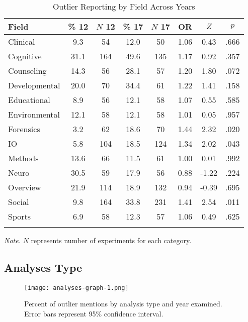 \documentclass[english,,man,mask]{apa6}
\theoremstyle{definition}
\theoremstyle{definition}
\theoremstyle{definition}
\theoremstyle{remark}
\begin{document}
\begin{table}[tbp]
\begin{center}
\begin{threeparttable}
\caption{\label{tab:info-table}Outlier Reporting by Field Across Years}
\begin{tabular}{lccccccc}
\toprule
Field & \% 12 & $N$ 12 & \% 17 & $N$ 17 & OR & $Z$ & $p$\\
\midrule
Clinical & 9.3 & 54 & 12.0 & 50 & 1.06 & 0.43 & .666\\
Cognitive & 31.1 & 164 & 49.6 & 135 & 1.17 & 0.92 & .357\\
Counseling & 14.3 & 56 & 28.1 & 57 & 1.20 & 1.80 & .072\\
Developmental & 20.0 & 70 & 34.4 & 61 & 1.22 & 1.41 & .158\\
Educational & 8.9 & 56 & 12.1 & 58 & 1.07 & 0.55 & .585\\
Environmental & 12.1 & 58 & 12.1 & 58 & 1.01 & 0.05 & .957\\
Forensics & 3.2 & 62 & 18.6 & 70 & 1.44 & 2.32 & .020\\
IO & 5.8 & 104 & 18.5 & 124 & 1.34 & 2.02 & .043\\
Methods & 13.6 & 66 & 11.5 & 61 & 1.00 & 0.01 & .992\\
Neuro & 30.5 & 59 & 17.9 & 56 & 0.88 & -1.22 & .224\\
Overview & 21.9 & 114 & 18.9 & 132 & 0.94 & -0.39 & .695\\
Social & 9.8 & 164 & 33.8 & 231 & 1.41 & 2.54 & .011\\
Sports & 6.9 & 58 & 12.3 & 57 & 1.06 & 0.49 & .625\\
\bottomrule
\addlinespace
\end{tabular}
\begin{tablenotes}[para]
\normalsize{\textit{Note.} $N$ represents number of experiments for each category.}
\end{tablenotes}
\end{threeparttable}
\end{center}
\end{table}

\subsection{Analyses Type}\label{analyses-type}

\begin{figure}
\centering
\texttt{[image: analyses-graph-1.png]}
\caption{\label{fig:analyses-graph}Percent of outlier mentions by analysis
type and year examined. Error bars represent 95\% confidence interval.}
\end{figure}
\end{document}
